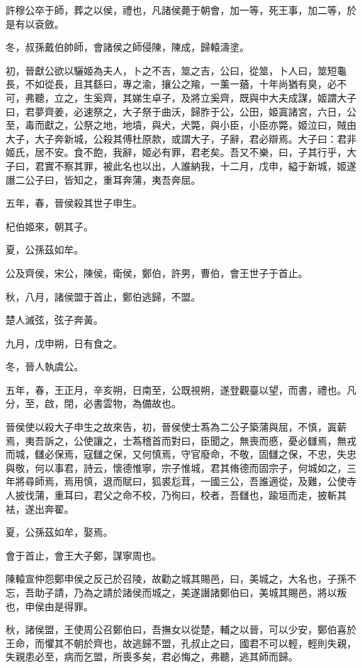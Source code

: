 \begin{pinyinscope}
許穆公卒于師，葬之以侯，禮也，凡諸侯薨于朝會，加一等，死王事，加二等，於是有以袞斂。

冬，叔孫戴伯帥師，會諸侯之師侵陳，陳成，歸轅濤塗。

初，晉獻公欲以驪姬為夫人，卜之不吉，筮之吉，公曰，從筮，卜人曰，筮短龜長，不如從長，且其繇曰，專之渝，攘公之羭，一薰一蕕，十年尚猶有臭，必不可，弗聽，立之，生奚齊，其娣生卓子，及將立奚齊，既與中大夫成謀，姬謂大子曰，君夢齊姜，必速祭之，大子祭于曲沃，歸胙于公，公田，姬寘諸宮，六日，公至，毒而獻之，公祭之地，地墳，與犬，犬斃，與小臣，小臣亦斃，姬泣曰，賊由大子，大子奔新城，公殺其傅杜原款，或謂大子，子辭，君必辯焉。大子曰：君非姬氏，居不安。食不飽，我辭，姬必有罪，君老矣。吾又不樂，曰，子其行乎，大子曰，君實不察其罪，被此名也以出，人誰納我，十二月，戊申，縊于新城，姬遂譖二公子曰，皆知之，重耳奔蒲，夷吾奔屈。

五年，春，晉侯殺其世子申生。

杞伯姬來，朝其子。

夏，公孫茲如牟。

公及齊侯，宋公，陳侯，衛侯，鄭伯，許男，曹伯，會王世子于首止。

秋，八月，諸侯盟于首止，鄭伯逃歸，不盟。

楚人滅弦，弦子奔黃。

九月，戊申朔，日有食之。

冬，晉人執虞公。

五年，春，王正月，辛亥朔，日南至，公既視朔，遂登觀臺以望，而書，禮也。凡分，至，啟，閉，必書雲物，為備故也。

晉侯使以殺大子申生之故來告，初，晉侯使士蒍為二公子築蒲與屈，不慎，寘薪焉，夷吾訴之，公使讓之，士蒍稽首而對曰，臣聞之，無喪而慼，憂必讎焉，無戎而城，讎必保焉，寇讎之保，又何慎焉，守官廢命，不敬，固讎之保，不忠，失忠與敬，何以事君，詩云，懷德惟寧，宗子惟城，君其脩德而固宗子，何城如之，三年將尋師焉，焉用慎，退而賦曰，狐裘尨茸，一國三公，吾誰適從，及難，公使寺人披伐蒲，重耳曰，君父之命不校，乃徇曰，校者，吾讎也，踰垣而走，披斬其袪，遂出奔翟。

夏，公孫茲如牟，娶焉。

會于首止，會王大子鄭，謀寧周也。

陳轅宣仲怨鄭申侯之反己於召陵，故勸之城其賜邑，曰，美城之，大名也，子孫不忘，吾助子請，乃為之請於諸侯而城之，美遂譖諸鄭伯曰，美城其賜邑，將以叛也，申侯由是得罪。

秋，諸侯盟，王使周公召鄭伯曰，吾撫女以從楚，輔之以晉，可以少安，鄭伯喜於王命，而懼其不朝於齊也，故逃歸不盟，孔叔止之曰，國君不可以輕，輕則失親，失親患必至，病而乞盟，所喪多矣，君必悔之，弗聽，逃其師而歸。


\end{pinyinscope}
